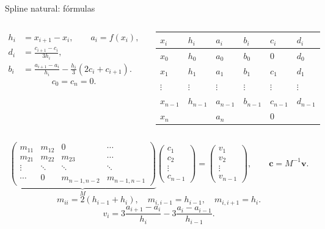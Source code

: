 \documentclass[original_version/main.tex]{subfiles}
\begin{document}
\begin{frame}[t]{Spline natural: fórmulas}
\begin{columns}[T]\scriptsize\begin{align*}
h_i&=x_{i+1}-x_i,\qquad a_i=f(x_i),\\
d_i&=\frac{c_{i+1}-c_i}{3h_i},\\
b_i&=\frac{a_{i+1}-a_i}{h_i}-\frac{h_i}{3}(2c_i+c_{i+1}).
\end{align*}\[c_0=c_n=0.\]\begin{minipage}[t]{\textwidth}\begingroup\scriptsize\setlength{\tabcolsep}{2pt}\begin{center}\begin{tabular}{|C{.12\textwidth}|C{.12\textwidth}|C{.12\textwidth}|C{.12\textwidth}|C{.12\textwidth}|C{.12\textwidth}|}\hline
\rule[-2mm]{0pt}{5mm}$x_i$&$h_i$&$a_i$&$b_i$&$c_i$&$d_i$\\\hline
\rule[-2.5mm]{0pt}{5mm}$x_0$&$h_0$&$a_0$&$b_0$&$0$&$d_0$\\\hline
\rule[-2.5mm]{0pt}{5mm}$x_1$&$h_1$&$a_1$&$b_1$&$c_1$&$d_1$\\\hline
\rule[-2.5mm]{0pt}{5mm}$\vdots$&$\vdots$&$\vdots$&$\vdots$&$\vdots$&$\vdots$\\\hline
\rule[-2.5mm]{0pt}{5mm}$x_{n-1}$&$h_{n-1}$&$a_{n-1}$&$b_{n-1}$&$c_{n-1}$&$d_{n-1}$\\\hline
\rule[-2.5mm]{0pt}{5mm}$x_n$& &$a_n$& &$0$& \\\hline
\end{tabular}\end{center}\endgroup\end{minipage}\par
\end{columns}\scriptsize
\[\underbrace{\begin{pmatrix}
m_{11}&m_{12}&0&\cdots\\
m_{21}&m_{22}&m_{23}&\cdots\\
\vdots&\ddots&\ddots&\ddots\\
\cdots&0&m_{n-1,n-2}&m_{n-1,n-1}
\end{pmatrix}}_{M}
\begin{pmatrix}c_1\\c_2\\\vdots\\c_{n-1}\end{pmatrix}
=\begin{pmatrix}v_1\\v_2\\\vdots\\v_{n-1}\end{pmatrix},\qquad \boldsymbol c=M^{-1}\boldsymbol v.\]
\scriptsize
\[m_{ii}=2(h_{i-1}+h_i),\quad m_{i,i-1}=h_{i-1},\quad m_{i,i+1}=h_i.\]
\[v_i=3\frac{a_{i+1}-a_i}{h_i}-3\frac{a_i-a_{i-1}}{h_{i-1}}.\]
\end{frame}
\end{document}
